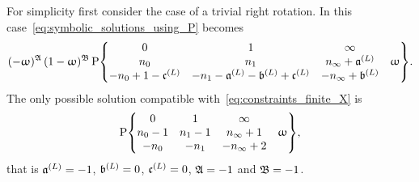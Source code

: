 For simplicity first consider the case of a trivial right rotation.\footnotemark{}
In this case~\eqref{eq:symbolic_solutions_using_P} becomes
\begin{equation}
  (-\omega)^\ffA\,
  (1-\omega)^\ffB\,
  \rP\qty{
  \mqty{
    0
    &
    1
    &
    \infty
    &
    \\
    n_{0}
    &
    n_{1}
    &
    n_{\infty} + \ffa^{(L)}
    &
    \omega
    \\
    -n_{0} + 1 -\ffc^{(L)}
    &
    -n_{1} - \ffa^{(L)} - \ffb^{(L)} + \ffc^{(L)}
    &
    -n_{\infty} + \ffb^{(L)}
    &
  }
  }.
\end{equation}
The only possible solution compatible with~\eqref{eq:constraints_finite_X} is
\begin{equation}
  \rP\qty{
  \mqty{
    0
    &
    1
    &
    \infty
    &
    \\
    n_{0} - 1
    &
    n_{1} - 1
    &
    n_{\infty} + 1
    &
    \omega
    \\
    -n_{0}
    &
    -n_{1}
    &
    -n_{\infty} + 2
    &
  }
  },
  \label{eq:X_solution_pure_L}
\end{equation}
that is $\mathfrak{a}^{(L)} = -1$, $\mathfrak{b}^{(L)} = 0$, $\mathfrak{c}^{(L)} = 0$, $\mathfrak{A} = -1$ and  $\mathfrak{B} = -1$.

